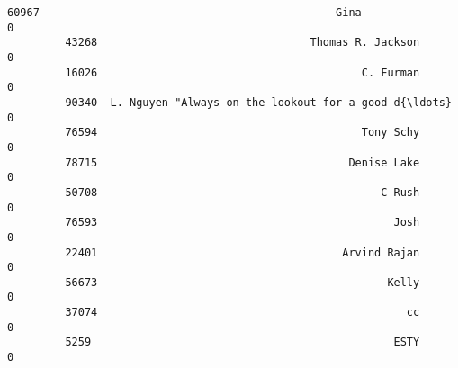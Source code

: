 \documentclass[11pt]{article}
\begin{document}
\begin{Verbatim}[commandchars=\\\{\}]
         60967                                              Gina                     0   
         43268                                 Thomas R. Jackson                     0   
         16026                                         C. Furman                     0   
         90340  L. Nguyen "Always on the lookout for a good d{\ldots}                     0   
         76594                                         Tony Schy                     0   
         78715                                       Denise Lake                     0   
         50708                                            C-Rush                     0   
         76593                                              Josh                     0   
         22401                                      Arvind Rajan                     0   
         56673                                             Kelly                     0   
         37074                                                cc                     0   
         5259                                               ESTY                     0   
         

\end{Verbatim}
\end{document}
